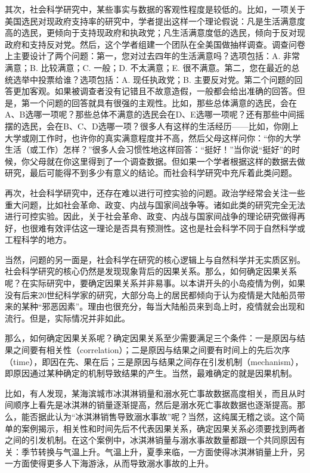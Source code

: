 其次，社会科学研究中，某些事实与数据的客观性程度是较低的。比如，一项关于美国选民对现政府支持率的研究中，学者提出这样一个理论假说：凡是生活满意度高的选民，更倾向于支持现政府和执政党；凡生活满意度低的选民，倾向于反对现政府和支持反对党。然后，这个学者组建一个团队在全美国做抽样调查。调查问卷上主要设计了两个问题：第一，您对过去四年的生活满意吗？选项包括：A. 非常满意；B. 比较满意；C. 一般；D. 不太满意；E. 很不满意。第二，您在最近的总统选举中投票给谁？选项包括：A. 现任执政党；B. 主要反对党。第二个问题的回答更加客观。如果被调查者没有记错且不故意造假，一般都会给出准确的回答。但是，第一个问题的回答就具有很强的主观性。比如，那些总体满意的选民，会在A、B选哪一项呢？那些总体不满意的选民会在D、E选哪一项呢？还有那些中间摇摆的选民，会在B、C、D选哪一项？很多人有这样的生活经历——比如，你刚上大学或刚工作时，也许你的真实满意程度并不高，然后父母这样问你：“你的大学生活（或工作）怎样？”很多人会习惯性地这样回答：“挺好！”当你说“挺好”的时候，你父母就在你这里得到了一个调查数据。但如果一个学者根据这样的数据去做研究，最后可能得不到多少有意义的结论。而社会科学研究中充斥着此类问题。

再次，社会科学研究中，还存在难以进行可控实验的问题。政治学经常会关注一些重大问题，比如社会革命、政变、内战与国家间战争等。诸如此类的研究完全无法进行可控实验。因此，关于社会革命、政变、内战与国家间战争的理论研究做得再好，也很难有效评估这一理论是否具有预测性。这也是社会科学不同于自然科学或工程科学的地方。

当然，问题的另一面是，社会科学在研究的核心逻辑上与自然科学并无实质区别。社会科学研究的核心仍然是发现现象背后的因果关系。那么，如何确定因果关系呢？在实际研究中，要确定因果关系并非易事。以本讲开头的小岛疫情为例，如果没有后来20世纪科学家的研究，大部分岛上的居民都倾向于认为疫情是大陆船员带来的某种“邪恶因素”。理由也很充分，每当大陆船员来到岛上时，疫情就会出现和流行。但是，实际情况并非如此。

那么，如何确定因果关系呢？确定因果关系至少需要满足三个条件：一是原因与结果之间要有相关性（correlation）；二是原因与结果之间要有时间上的先后次序（time），即因在先、果在后；三是原因与结果之间存在引发机制（mechanism），即原因通过某种确定的机制导致结果的产生。当然，最难确定的就是因果机制。

比如，有人发现，某海滨城市冰淇淋销量和溺水死亡事故数据高度相关，而且从时间顺序上看先是冰淇淋的销量逐渐提高，然后是溺水死亡事故数据也逐渐提高。那么，能否据此认为“冰淇淋销售导致溺水事故”呢？当然，这纯属无稽之谈。这个简单的案例揭示，相关性和时间先后不代表因果关系，确定因果关系必须要找到两者之间的引发机制。在这个案例中，冰淇淋销量与溺水事故数量都跟一个共同原因有关：季节转换与气温上升。气温上升，夏季来临，一方面使得冰淇淋销量上升，另一方面使得更多人下海游泳，从而导致溺水事故的上升。

